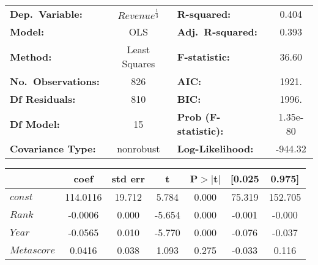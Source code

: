             \begin{table}[H]
                \begin{center}
                    \begin{tabular}{lclc}
                        \toprule
                        \textbf{Dep.~Variable:}    & $Revenue^{\frac{1}{3}}$ & \textbf{  R-squared:         } & 0.404    \\
                        \textbf{Model:}            & OLS                     & \textbf{  Adj.~R-squared:    } & 0.393    \\
                        \textbf{Method:}           & Least Squares           & \textbf{  F-statistic:       } & 36.60    \\
                        \textbf{No.~Observations:} & 826                     & \textbf{  AIC:               } & 1921.    \\
                        \textbf{Df Residuals:}     & 810                     & \textbf{  BIC:               } & 1996.    \\
                        \textbf{Df Model:}         & 15                      & \textbf{  Prob (F-statistic):} & 1.35e-80 \\
                        \textbf{Covariance Type:}  & nonrobust               & \textbf{  Log-Likelihood:    } & -944.32  \\
                        \bottomrule
                    \end{tabular}
                    \begin{tabular}{lcccccc}
                                                        & \textbf{coef} & \textbf{std err} & \textbf{t} & \textbf{P$> |$t$|$} & \textbf{[0.025} & \textbf{0.975]} \\
                        \midrule
                        \textbf{$const$}                & 114.0116      & 19.712           & 5.784      & 0.000               & 75.319          & 152.705         \\
                        \textbf{$Rank$}                 & -0.0006       & 0.000            & -5.654     & 0.000               & -0.001          & -0.000          \\
                        \textbf{$Year$}                 & -0.0565       & 0.010            & -5.770     & 0.000               & -0.076          & -0.037          \\
                        \textbf{$Metascore$}            & 0.0416        & 0.038            & 1.093      & 0.275               & -0.033          & 0.116           \\

\end{tabular}
\end{center}
\end{table}
